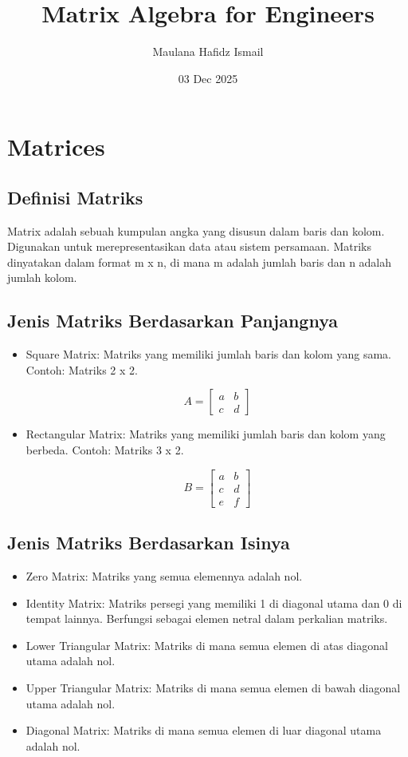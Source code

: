\documentclass{article}
\title{Matrix Algebra for Engineers}
\date{03 Dec 2025}
\author{Maulana Hafidz Ismail}
\begin{document}
\maketitle
\newpage

\tableofcontents
\newpage
{}

\section{Matrices}
\subsection{Definisi Matriks}
Matrix adalah sebuah kumpulan angka yang disusun dalam baris dan kolom. Digunakan untuk merepresentasikan data atau sistem persamaan. Matriks dinyatakan dalam format m x n, di mana m adalah jumlah baris dan n adalah jumlah kolom.

\subsection{Jenis Matriks Berdasarkan Panjangnya}
\begin{itemize}
    \item Square Matrix: Matriks yang memiliki jumlah baris dan kolom yang sama. Contoh: Matriks 2 x 2.

          \[ A = \begin{bmatrix} a & b \\ c & d \end{bmatrix} \]

    \item Rectangular Matrix: Matriks yang memiliki jumlah baris dan kolom yang berbeda. Contoh: Matriks 3 x 2.

          \[ B = \begin{bmatrix} a & b \\ c & d \\ e & f \end{bmatrix} \]
\end{itemize}

\subsection{Jenis Matriks Berdasarkan Isinya}
\begin{itemize}
    \item Zero Matrix: Matriks yang semua elemennya adalah nol.
    \item Identity Matrix: Matriks persegi yang memiliki 1 di diagonal utama dan 0 di tempat lainnya. Berfungsi sebagai elemen netral dalam perkalian matriks.
    \item Lower Triangular Matrix: Matriks di mana semua elemen di atas diagonal utama adalah nol.
    \item Upper Triangular Matrix: Matriks di mana semua elemen di bawah diagonal utama adalah nol.
    \item Diagonal Matrix: Matriks di mana semua elemen di luar diagonal utama adalah nol.
\end{itemize}
\end{document}
